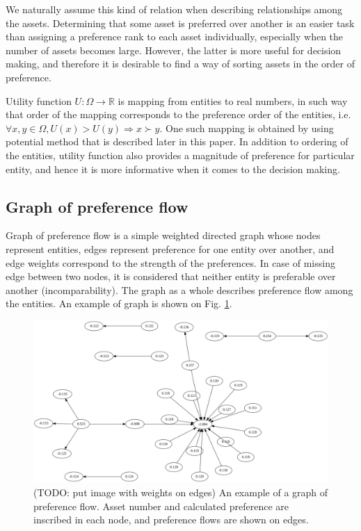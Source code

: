 \documentclass[letterpaper, 10 pt, conference]{ieeeconf}
\begin{document}
  We naturally assume this kind of relation when describing relationships among the assets.
  Determining that some asset is preferred over another is an easier task than assigning a preference rank to each asset individually, especially when the number of assets becomes large.
  However, the latter is more useful for decision making, and therefore it is desirable to find a way of sorting assets in the order of preference.
  
  Utility function $U\colon \Omega \to \mathbb{R}$ is mapping from entities to real numbers, in such way that order of the mapping corresponds to the preference order of the entities, i.e. $\forall x, y \in \Omega, U(x) > U(y) \Rightarrow x \succ y$.
  One such mapping is obtained by using potential method that is described later in this paper.
  In addition to ordering of the entities, utility function also provides a magnitude of preference for particular entity, and hence it is more informative when it comes to the decision making.
  
  \subsection{Graph of preference flow}
  
  Graph of preference flow is a simple weighted directed graph whose nodes represent entities, edges represent preference for one entity over another, and edge weights correspond to the strength of the preferences.
  In case of missing edge between two nodes, it is considered that neither entity is preferable over another (incomparability).
  The graph as a whole describes preference flow among the entities.
  An example of graph is shown on Fig. \ref{fig:graph}.
  
  \begin{figure}[h]
    \centering
    \includegraphics[width=\columnwidth]{graphics/graph.pdf}
    \caption{(TODO: put image with weights on edges) An example of a graph of preference flow. Asset number and calculated preference are inscribed in each node, and preference flows are shown on edges.}
    \label{fig:graph}
  \end{figure}
  
\end{document}
